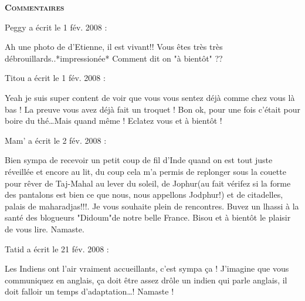 \bigskip
\textbf{\textsc{Commentaires}}

\medskip
Peggy a écrit le 1 fév. 2008 :
\begin{displayquote}
Ah une photo de d'Etienne, il est vivant!!
Vous êtes très très débrouillards..*impressionée*
Comment dit on "à bientôt" ??
\end{displayquote}

\medskip
Titou a écrit le 1 fév. 2008 :
\begin{displayquote}
Yeah je suis super content de voir que vous vous sentez déjà comme chez vous là bas ! La preuve vous avez déjà fait un troquet ! Bon ok, pour une fois c'était pour boire du thé\dots Mais quand même ! Eclatez vous et à bientôt !
\end{displayquote}

\medskip
Mam' a écrit le 2 fév. 2008 :
\begin{displayquote}
Bien sympa de recevoir un petit coup de fil d'Inde quand on est tout juste réveillée et encore au lit, du coup cela m'a permis de replonger sous la couette pour rêver de Taj-Mahal au lever du soleil, de Jophur(au fait vérifez si la forme des pantalons est bien ce que nous, nous appellons Jodphur!) et de citadelles, palais de maharadjas!!!. Je vous souhaite plein de rencontres. Buvez un lhassi à la santé des blogueurs "Didoum"de notre belle France. Bisou et à bientôt le plaisir de vous lire. Namaste.
\end{displayquote}

\medskip
Tatid a écrit le 21 fév. 2008 :
\begin{displayquote}
Les Indiens ont l'air vraiment accueillants, c'est sympa ça ! J'imagine que vous communiquez en anglais, ça doit être assez drôle un indien qui parle anglais, il doit falloir un temps d'adaptation\dots !
Namaste !
\end{displayquote}

\vfill
